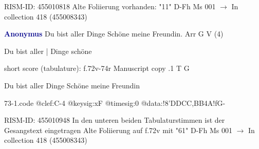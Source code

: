 \documentclass[twocolumn]{book}
\begin{document}
\newline RISM-ID: 455010818
\newline Alte Foliierung vorhanden: "11"
\newline D-Fh  Ms 001
\newline $\rightarrow$ In collection 418 (455008343)

\newline \par \vspace{7pt} \textcolor{darkblue}{\textbf{Anonymus  }}
\newline Du bist aller Dinge Schöne meine Freundin. Arr  G  
\newline V (4)
\newline \begin{itshape}[f.72v, at left:] Du bist aller | Dinge schöne\end{itshape} 
\newline \textcolor{darkblue}{}  short score (tabulature): f.72v-74r  
\newline Manuscript copy
.1  T  G
\newline \begin{footnotesize} Du bist aller Dinge Schöne meine Freundin \end{footnotesize}  
\begin{filecontents*}{73-1.code}
@clef:C-4
@keysig:xF
@timesig:0
@data:!{8'DDCC}{,BB}4A!fG-
\end{filecontents*}
\newline
%

\newline RISM-ID: 455010948
\newline In den unteren beiden Tabulaturstimmen ist der Gesangstext eingetragen
\newline Alte Foliierung auf f.72v mit "61"
\newline D-Fh  Ms 001
\newline $\rightarrow$ In collection 418 (455008343)
\end{document}
